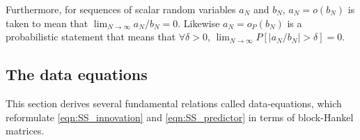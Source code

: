 Furthermore, for sequences of scalar random variables $a_N$ and $b_N$, $a_N = o(b_N)$ is taken to mean that ${\lim_{N\rightarrow\infty}a_N/b_N=0}$. Likewise $a_N=o_P(b_N)$ is a probabilistic statement that means that $\forall \delta > 0$, ${\lim_{N\rightarrow\infty}P[|a_N/b_N|>\delta]=0}$.
% 
\subsection{The data equations}\label{sec:DerivingDataEquations}
This section derives several fundamental relations called data-equations, which reformulate \eqref{eqn:SS_innovation} and \eqref{eqn:SS_predictor} in terms of block-Hankel matrices.

